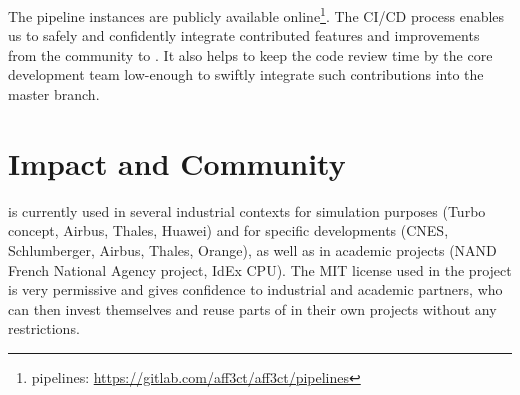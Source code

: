 The \AFFECT pipeline instances are publicly available online\footnote{\AFFECT
pipelines: \url{https://gitlab.com/aff3ct/aff3ct/pipelines}}. The CI/CD process
enables us to safely and confidently integrate contributed features and
improvements from the community to \AFFECT. It also helps to keep the code
review time by the core development team low-enough to swiftly integrate such
contributions into the master branch.

\section{Impact and Community}
\label{sec:aff3ct_impact}

\AFFECT is currently used in several industrial contexts for simulation purposes
(Turbo concept, Airbus, Thales, Huawei) and for specific developments (CNES,
Schlumberger, Airbus, Thales, Orange), as well as in academic projects (NAND
French National Agency project, IdEx CPU). The MIT license used in the project
is very permissive and gives confidence to industrial and academic partners, who
can then invest themselves and reuse parts of \AFFECT in their own projects
without any restrictions.


